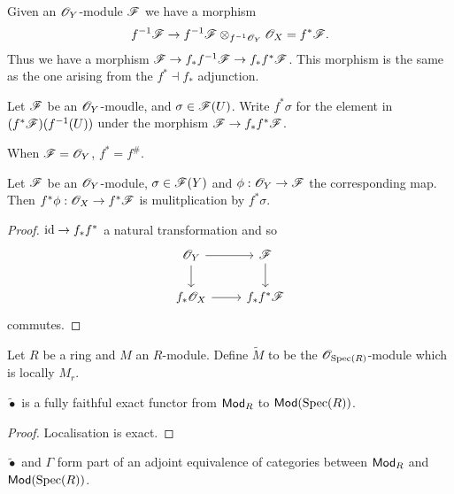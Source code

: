 \documentclass{memoir}
\begin{document}
\begin{remark}
    Given an $\mathscr{O}_Y$-module $\mathscr{F}$ we have a morphism 
    \begin{equation}
        f^{-1}\mathscr{F}\to f^{-1}\mathscr{F}\otimes_{f^{-1}\mathscr{O}_Y}\mathscr{O}_X = f^*\mathscr{F}.
    \end{equation}
    Thus we have a morphism $\mathscr{F}\to f_*f^{-1}\mathscr{F} \to f_*f^*\mathscr{F}$.
    This morphism is the same as the one arising from the $f^*\dashv f_*$ adjunction.
\end{remark}
\begin{definition}
    Let $\mathscr{F}$ be an $\mathscr{O}_Y$-moudle, and $\sigma\in \mathscr{F}(U)$.
    Write $f^*\sigma$ for the element in $(f^*\mathscr{F})(f^{-1}(U))$ under the morphism $\mathscr{F}\to f_*f^*\mathscr{F}$.
\end{definition}
\begin{remark}
    When $\mathscr{F} = \mathscr{O}_Y$, $f^* = f^\#$.
\end{remark}
\begin{proposition}
    Let $\mathscr{F}$ be an $\mathscr{O}_Y$-module, $\sigma\in \mathscr{F}(Y)$ and $\phi:\mathscr{O}_Y\to \mathscr{F}$ the corresponding map.
    Then $f^*\phi:\mathscr{O}_X\to f^*\mathscr{F}$ is mulitplication by $f^*\sigma$.
\end{proposition}
\begin{proof}
    $\operatorname{id}\to f_*f^*$ a natural transformation and so
    \begin{equation}
        \begin{tikzcd}
            \shf{O}_Y \arrow[r] \arrow[d] & \shf{F} \arrow[d] \\
            f_*\shf{O}_X \arrow[r] & f_*f^*\shf{F}
        \end{tikzcd}
    \end{equation}
    commutes.
\end{proof}
\begin{definition}
    Let $R$ be a ring and $M$ an $R$-module. 
    Define $\tilde M$ to be the $\mathscr{O}_{\operatorname{Spec}(R)}$-module which is locally $M_r$.
\end{definition}
\begin{thm}
    $\tilde \bullet$ is a fully faithful exact functor from ${\normalfont\mathsf{Mod}}_R$ to ${\normalfont\mathsf{Mod}}(\operatorname{Spec}(R))$.
\end{thm}
\begin{proof}
    Localisation is exact.
\end{proof}
\begin{corollary}
    $\tilde \bullet$ and $\Gamma$ form part of an adjoint equivalence of categories between ${\normalfont\mathsf{Mod}}_R$ and ${\normalfont\mathsf{Mod}}(\operatorname{Spec}(R))$.
\end{corollary}
\end{document}
